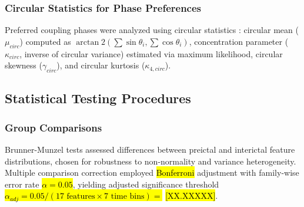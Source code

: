 \subsubsection{Circular Statistics for Phase Preferences}
Preferred coupling phases were analyzed using circular statistics \cite{PintoOrellana2023StatisticalIFF}: circular mean ($\mu_{circ}$) computed as $\arctan2(\sum \sin \theta_i, \sum \cos \theta_i)$, concentration parameter ($\kappa_{circ}$, inverse of circular variance) estimated via maximum likelihood, circular skewness ($\gamma_{circ}$), and circular kurtosis ($\kappa_{4,circ}$).



\subsection{Statistical Testing Procedures}
\subsubsection{Group Comparisons}
Brunner-Munzel tests assessed differences between preictal and interictal feature distributions, chosen for robustness to non-normality and variance heterogeneity. Multiple comparison correction employed \hl{Bonferroni} adjustment with family-wise error rate \hl{$\alpha = 0.05$}, yielding adjusted significance threshold \hl{$\alpha_{adj} = 0.05/(17 \text{ features} \times 7 \text{ time bins}) = $} \hl{[XX.XXXXX]}.

